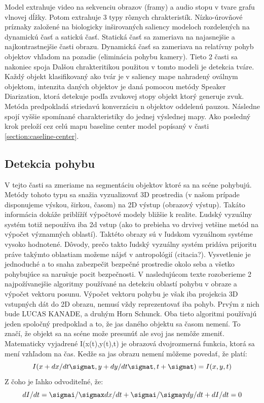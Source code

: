 Model extrahuje video na sekvenciu obrazov (framy) a audio stopu v tvare grafu vlnovej dĺžky.
Potom extrahuje 3 typy rôznych chrakteristík.
Nízko-úrovňové príznaky založené na biologicky inširovaných saliency modeloch rozdelených na dynamickú časť a satickú časť.
Statická časť sa zameriava na najasnejšie a najkontrastnejšie časti obrazu.
Dynamická časť sa zameriava na relatívny pohyb objektov vhľadom na pozadie (eliminácia pohybu kamery).
Tieto 2 časti sa nakoniec spoja
Dalšou chrakteritikou použitou v tomto modeli je detekcia tváre.
Každý objekt klasifikovaný ako tvár je v saliency mape nahradený oválnym objektom, intenzita daných objektov je daná pomocou metódy Speaker Diarization, ktorá detekuje podľa zvukovej stopy objekt ktorý generuje zvuk.
Metóda predpokladá striedavú konverzáciu n objektov oddelenú pauzou.
Následne spojí vyššie spomínané charakteristiky do jednej výslednej mapy.
Ako posledný krok preloží cez celú mapu baseline center model popísaný v časti \ref{section:caseline-center}.

\subsection{Detekcia pohybu}
V tejto časti sa zmeriame na segmentáciu objektov ktoré sa na scéne pohybujú.
Metódy tohoto typu sa snažia vyzualizovať 3D prostredia (v našom prípade disponujeme výskou, širkou, časom) na 2D výstup (obrazový výstup).
Takáto informácia dokáže priblížíť výpočtové modely bližšie k realite.
Ľudský vyzuálny systém totiž nepoužíva iba 2d vstup (ako to prebieha vo drvivej vetšine metód na výpočet významných oblastí).
Taktéto obrazy sú v ľudskom vyzuálnom systéme vysoko hodnotené.
Dôvody, prečo takto ľudský vyzuálny systém pridáva prijoritu práve takýmto oblastiam možeme nájsť v antropológií (citacia?).
Vysvetlenie je jednoduché a to snaha zabezpečit bezpečné prostredie okolo seba a všetko pohybujúce sa narušuje pocit bezpečnosti.
V nasledujúcom texte rozoberieme 2 najpožívanejšie algoritmy používané na detekciu oblastí pohybu v obraze a výpočet vektoru posunu.
Výpočet vektoru pohybu je však iba projekcia 3D vstupných dát do 2D obrazu, nemusí vždy reprezentovať iba pohyb.
Prvým z nich bude LUCAS KANADE\cite{lucas-kanade}, a druhým Horn Schunck\cite{horn-schunck}.
Oba tieto algoritmi používajú jeden spoločný predpoklad a to, že jas daného objektu sa časom nemení.
To značí, že objekt sa na scéne može presunúť  ale svoj jas nemôže zmeniť.
Matematicky vyjadrené I(x(t),y(t),t) je obrazová dvojrozmerná funkcia, ktorá sa mení vzhľadom na čas.
Kedže sa jas obrazu nemení môžeme povedať, že platí:
\begin{equation}
  I(x + dx/dt \sigmat ,y + dy/dt \sigmat, t + \sigmat) = I(x,y,t)
\end{equation}
Z čoho je ľahko odvoditeľné, že:
\begin{equation}
  dI/dt = \sigmai/\sigmax dx/dt + \sigmai/\sigmay dy/dt + dI/dt  =  0
\end{equation}

